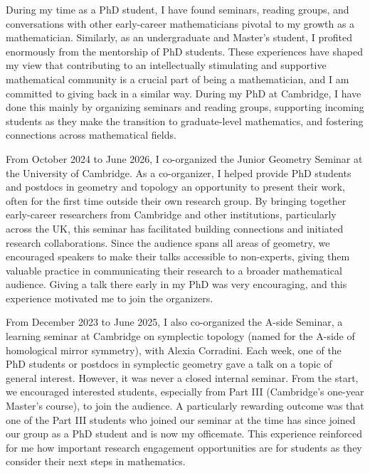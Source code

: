 
During my time as a PhD student, I have found seminars, reading groups, and conversations with other early-career mathematicians pivotal to my growth as a mathematician. Similarly, as an undergraduate and Master’s student, I profited enormously from the mentorship of PhD students. These experiences have shaped my view that contributing to an intellectually stimulating and supportive mathematical community is a crucial part of being a mathematician, and I am committed to giving back in a similar way. During my PhD at Cambridge, I have done this mainly by organizing seminars and reading groups, supporting incoming students as they make the transition to graduate-level mathematics, and fostering connections across mathematical fields.

From October 2024 to June 2026, I co-organized the Junior Geometry Seminar at the University of Cambridge. As a co-organizer, I helped provide PhD students and postdocs in geometry and topology an opportunity to present their work, often for the first time outside their own research group. By bringing together early-career researchers from Cambridge and other institutions, particularly across the UK, this seminar has facilitated building connections and initiated research collaborations. Since the audience spans all areas of geometry, we encouraged speakers to make their talks accessible to non-experts, giving them valuable practice in communicating their research to a broader mathematical audience. Giving a talk there early in my PhD was very encouraging, and this experience motivated me to join the organizers.

From December 2023 to June 2025, I also co-organized the A-side Seminar, a learning seminar at Cambridge on symplectic topology (named for the A-side of homological mirror symmetry), with Alexia Corradini. Each week, one of the PhD students or postdocs in symplectic geometry gave a talk on a topic of general interest. However, it was never a closed internal seminar. From the start, we encouraged interested students, especially from Part III (Cambridge’s one-year Master’s course), to join the audience. A particularly rewarding outcome was that one of the Part III students who joined our seminar at the time has since joined our group as a PhD student and is now my officemate. This experience reinforced for me how important research engagement opportunities are for students as they consider their next steps in mathematics.

